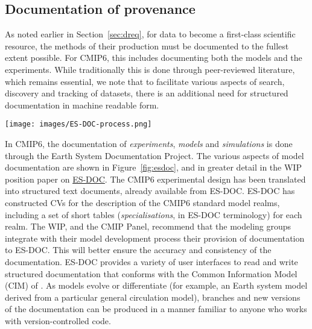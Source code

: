 \documentclass[gmd,manuscript]{copernicus}
\newcommand{\bibref}[1] { \cite{ref:#1}}
\newcommand{\figref}[1] {\mbox{Figure   \ref{fig:#1}}}
\newcommand{\secref}[1] {\mbox{Section  \ref{sec:#1}}}
\begin{document}
\subsection{Documentation of provenance}
\label{sec:doc}

As noted earlier in \secref{dreq}, for data to become a first-class
scientific resource, the methods of their production must be
documented to the fullest extent possible. For CMIP6, this includes
documenting both the models and the experiments. While traditionally
this is done through peer-reviewed literature, which remains
essential, we note that to facilitate various aspects of search,
discovery and tracking of datasets, there is an additional need for
structured documentation in machine readable form.

\begin{figure*}
  \begin{center}
    \texttt{[image: images/ES-DOC-process.png]}
  \end{center}
  \caption{Flowchart of ES-DOC documentation process, delineating
    sequence of events and indicating the parties responsible for
    producing the documentation. Figure courtesy Eric Guilyardi and
    Mark Greenslade.}
  \label{fig:esdoc}
\end{figure*}

In CMIP6, the documentation of \emph{experiments}, \emph{models} and
\emph{simulations} is done through the Earth System Documentation
\citep[\href{https://goo.gl/WNwKD9}{ES-DOC},][]{ref:guilyardietal2013}
Project. The various aspects of model documentation are shown in
\figref{esdoc}, and in greater detail in the WIP position paper on
\href{https://goo.gl/S3vVxE}{ES-DOC}. The CMIP6 experimental design
has been translated into structured text documents, already available
from ES-DOC. ES-DOC has constructed CVs for the description of the
CMIP6 standard model realms, including a set of short tables
(\emph{specialisations}, in ES-DOC terminology) for each realm. The
WIP, and the CMIP Panel, recommend that the modeling groups integrate
with their model development process their provision of documentation
to ES-DOC. This will better ensure the accuracy and consistency of the
documentation. ES-DOC provides a variety of user interfaces to read
and write structured documentation that conforms with the Common
Information Model (CIM) of \bibref{lawrenceetal2012}. As models evolve
or differentiate (for example, an Earth system model derived from a
particular general circulation model), branches and new versions of
the documentation can be produced in a manner familiar to anyone who
works with version-controlled code.
\end{document}
